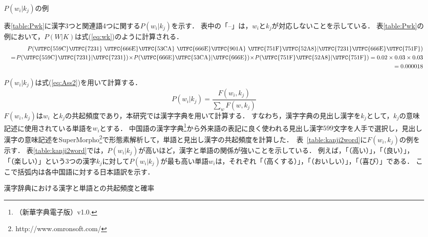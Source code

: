\documentclass[japanese]{jnlp_1.4}
\begin{document}
{\begin{table}[b]
\caption{$P(w_{i}|k_{j})$の例}
\label{table:Pwk}

\end{table}

表\ref{table:Pwk}に漢字3つと関連語4つに関する$P(w_{i}|k_{j})$を示す．
表中の「--」は，$w_{i}$と$k_{j}$が対応しないことを示している．
表\ref{table:Pwk}の例において，$P(W|K)$は式(\ref{eq:wk})のように計算される．
\begin{eqnarray}
&&P(\textrm{\UTFC{559C}\UTFC{7231} \UTFC{666E}\UTFC{53CA} \UTFC{666E}\UTFC{901A} \UTFC{751F}\UTFC{52A8}}|\textrm{\UTFC{7231}\UTFC{666E}\UTFC{751F}})\label{eq:wk} \nonumber\\
&&=\!P(\textrm{\UTFC{559C}\UTFC{7231}}|\textrm{\UTFC{7231}})\!\times \!P(\textrm{\UTFC{666E}\UTFC{53CA}}|\textrm{\UTFC{666E}})\!\times \!P(\textrm{\UTFC{751F}\UTFC{52A8}}|\textrm{\UTFC{751F}})=0.02 \times 0.03 \times 0.03\\
&&=0.000018  \nonumber
\end{eqnarray}

$P(w_{i}|k_{j})$は式(\ref{eq:Ass2})を用いて計算する．
\begin{equation}
P(w_{i}|k_{j})=\frac{F(w_{i},k_{j})}{{\displaystyle\sum_{w}}F(w,k_{j})}\label{eq:Ass2}
\end{equation}
$F(w_{i},k_{j})$は$w_{i}$ と$k_{j}$の共起頻度であり，本研究では漢字字典を用いて計算する．
すなわち，漢字字典の見出し漢字を$k_{j}$として，$k_{j}$の意味記述に使用されている単語を$w_{i}$とする．
中国語の漢字字典\footnote{（新華字典電子版）v1.0.}から外来語の表記に良く使われる見出し漢字$599$文字を人手で選択し，見出し漢字の意味記述をSuperMorpho\footnote{http://www.omronsoft.com/}で形態素解析して，単語と見出し漢字の共起頻度を計算した．\
表~\ref{table:kanji2word}に$F(w_{i},k_{j})$の例を示す．
表\ref{table:kanji2word}では，$P(w_{i}|k_{j})$が高いほど，漢字と単語の関係が強いことを示している．
例えば，「\UTFC{9AD8}（高い）」，「\UTFC{597D}（良い）」，「\UTFC{4E50}（楽しい）」という3つの漢字$k_{j}$に対して$P(w_{i}|k_{j})$が最も高い単語$w_{i}$は，それぞれ「（高くする）」，「（おいしい）」，「（喜び）」である．
ここで括弧内は各中国語に対する日本語訳を示す．

\begin{table}[t]
\caption{漢字辞典における漢字と単語との共起頻度と確率}
\label{table:kanji2word}

\end{table}


}
\end{document}
